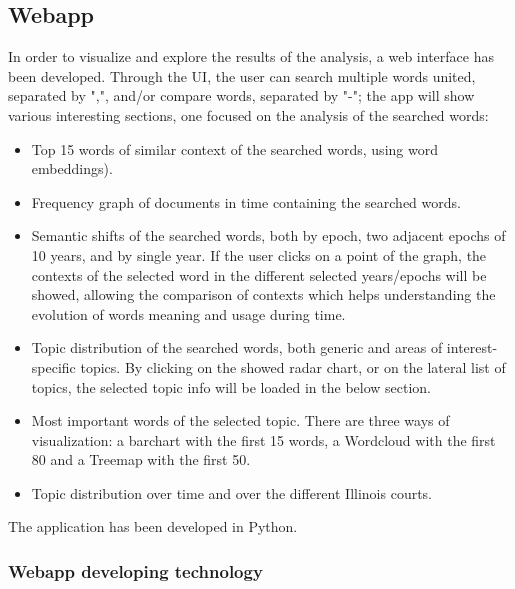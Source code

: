 \subsection{Webapp}
In order to visualize and explore the results of the analysis, a web interface has been developed. Through the UI, the
user can search multiple words united, separated by ",", and/or compare words, separated by "-"; the app will show
various interesting sections, one focused on the analysis of the searched words: 
\begin{itemize}
  \item Top 15 words of similar context of the searched words, using word embeddings).
  \item Frequency graph of documents in time containing the searched words.
  \item Semantic shifts of the searched words, both by epoch, two adjacent epochs of 10 years, and by single year.
    If the user clicks on a point of the graph, the contexts of the selected word in the different selected years/epochs
    will be showed, allowing the comparison of contexts which helps understanding the evolution of words meaning and usage
    during time.
  \item Topic distribution of the searched words, both generic and areas of interest-specific topics. By clicking on the
    showed radar chart, or on the lateral list of topics, the selected topic info will be loaded in the below section.
  \item Most important words of the selected topic. There are three ways of visualization: a barchart with the first 15
    words, a Wordcloud with the first 80 and a Treemap with the first 50.
  \item Topic distribution over time and over the different Illinois courts.
\end{itemize}
The application has been developed in Python. 

\subsubsection{Webapp developing technology}

